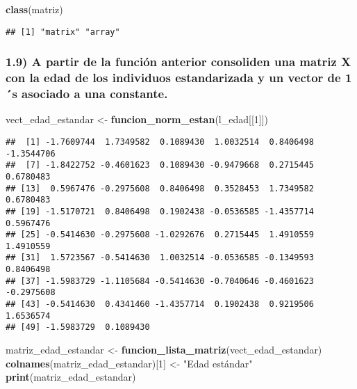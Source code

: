 \documentclass[
]{article}
\newenvironment{Shaded}{\begin{snugshade}}{\end{snugshade}}
\newcommand{\DecValTok}[1]{\textcolor[rgb]{0.00,0.00,0.81}{#1}}
\newcommand{\FunctionTok}[1]{\textcolor[rgb]{0.13,0.29,0.53}{\textbf{#1}}}
\newcommand{\NormalTok}[1]{#1}
\newcommand{\OtherTok}[1]{\textcolor[rgb]{0.56,0.35,0.01}{#1}}
\newcommand{\StringTok}[1]{\textcolor[rgb]{0.31,0.60,0.02}{#1}}
\begin{document}
\begin{Shaded}
\begin{Highlighting}[]
\FunctionTok{class}\NormalTok{(matriz)}
\end{Highlighting}
\end{Shaded}

\begin{verbatim}
## [1] "matrix" "array"
\end{verbatim}

\hypertarget{a-partir-de-la-funciuxf3n-anterior-consoliden-una-matriz-x-con-la-edad-de-los-individuos-estandarizada-y-un-vector-de-1s-asociado-a-una-constante.}{%
\subsubsection{1.9) A partir de la función anterior consoliden una
matriz X con la edad de los individuos estandarizada y un vector de 1´s
asociado a una
constante.}\label{a-partir-de-la-funciuxf3n-anterior-consoliden-una-matriz-x-con-la-edad-de-los-individuos-estandarizada-y-un-vector-de-1s-asociado-a-una-constante.}}

\begin{Shaded}
\begin{Highlighting}[]
\NormalTok{vect\_edad\_estandar }\OtherTok{\textless{}{-}} \FunctionTok{funcion\_norm\_estan}\NormalTok{(l\_edad[[}\DecValTok{1}\NormalTok{]])}
\end{Highlighting}
\end{Shaded}

\begin{verbatim}
##  [1] -1.7609744  1.7349582  0.1089430  1.0032514  0.8406498 -1.3544706
##  [7] -1.8422752 -0.4601623  0.1089430 -0.9479668  0.2715445  0.6780483
## [13]  0.5967476 -0.2975608  0.8406498  0.3528453  1.7349582  0.6780483
## [19] -1.5170721  0.8406498  0.1902438 -0.0536585 -1.4357714  0.5967476
## [25] -0.5414630 -0.2975608 -1.0292676  0.2715445  1.4910559  1.4910559
## [31]  1.5723567 -0.5414630  1.0032514 -0.0536585 -0.1349593  0.8406498
## [37] -1.5983729 -1.1105684 -0.5414630 -0.7040646 -0.4601623 -0.2975608
## [43] -0.5414630  0.4341460 -1.4357714  0.1902438  0.9219506  1.6536574
## [49] -1.5983729  0.1089430
\end{verbatim}

\begin{Shaded}
\begin{Highlighting}[]
\NormalTok{matriz\_edad\_estandar }\OtherTok{\textless{}{-}} \FunctionTok{funcion\_lista\_matriz}\NormalTok{(vect\_edad\_estandar)}
\FunctionTok{colnames}\NormalTok{(matriz\_edad\_estandar)[}\DecValTok{1}\NormalTok{] }\OtherTok{\textless{}{-}} \StringTok{"Edad estándar"}
\FunctionTok{print}\NormalTok{(matriz\_edad\_estandar)}
\end{Highlighting}
\end{Shaded}
\end{document}
